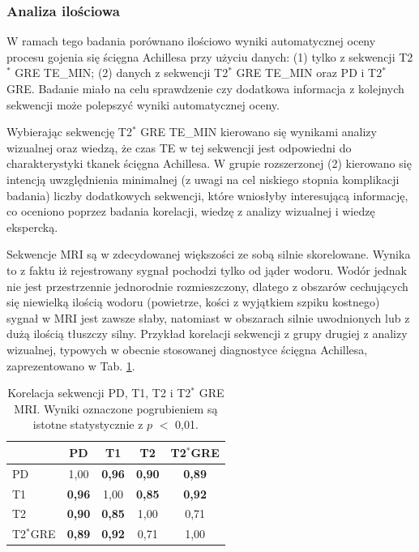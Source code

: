 \subsubsection{Analiza ilościowa} W ramach tego badania porównano ilościowo wyniki automatycznej oceny procesu gojenia się ścięgna Achillesa przy użyciu danych: (1) tylko z sekwencji \linebreak T2$^\ast$ GRE TE\_MIN; (2) danych z sekwencji T2$^\ast$ GRE TE\_MIN oraz PD i T2$^\ast$ GRE. Badanie miało na celu sprawdzenie czy dodatkowa informacja z kolejnych sekwencji może polepszyć wyniki automatycznej oceny. 

Wybierając sekwencję T2$^\ast$ GRE TE\_MIN kierowano się wynikami analizy wizualnej oraz wiedzą, że czas TE w tej sekwencji jest odpowiedni do charakterystyki tkanek ścięgna Achillesa. W grupie rozszerzonej (2) kierowano się intencją uwzględnienia minimalnej (z uwagi na cel niskiego stopnia komplikacji badania) liczby dodatkowych sekwencji, które wniosłyby interesującą informację, co oceniono poprzez badania korelacji, wiedzę z analizy wizualnej i wiedzę ekspercką. 

Sekwencje MRI są w zdecydowanej większości ze sobą silnie skorelowane. Wynika to z faktu iż rejestrowany sygnał pochodzi tylko od jąder wodoru. Wodór jednak nie jest przestrzennie jednorodnie rozmieszczony, dlatego z obszarów cechujących się niewielką ilością wodoru (powietrze, kości z wyjątkiem szpiku kostnego) sygnał w MRI jest zawsze słaby, natomiast w obszarach silnie uwodnionych lub z dużą ilością tłuszczy silny. Przykład korelacji sekwencji z grupy drugiej z analizy wizualnej, typowych w obecnie stosowanej diagnostyce ścięgna Achillesa, zaprezentowano w Tab. \ref{tab:inter-protocol-corr}.

\vspace{10px}
\renewcommand{\arraystretch}{1.2}
\begin{table}[h]
	\centering
	\setlength{\tabcolsep}{12pt}
	\caption{Korelacja sekwencji PD, T1, T2 i T2$^\ast$ GRE MRI. Wyniki oznaczone pogrubieniem są istotne statystycznie z $p$ $<$ 0,01.}
	\label{tab:inter-protocol-corr}
	\begin{tabular}{l||c|c|c|c}
		& PD & T1 & T2 & T2$^\ast$GRE \\ \hline \hline
		PD & 1,00 & \textbf{0,96} & \textbf{0,90} & \textbf{0,89} \\ \hline
		T1 & \textbf{0,96} & 1,00 & \textbf{0,85} & \textbf{0,92} \\ \hline
		T2 & \textbf{0,90} & \textbf{0,85} & 1,00 & 0,71 \\ \hline
		T2$^\ast$GRE & \textbf{0,89} & \textbf{0,92} & 0,71 & 1,00  %
	\end{tabular}
\end{table} 
\renewcommand{\arraystretch}{1}


